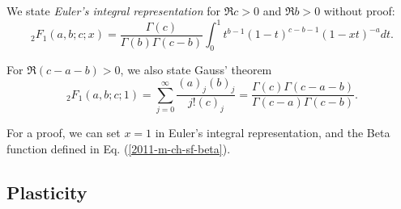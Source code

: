 We state {\em Euler's integral representation} for $\Re c>0$ and $\Re b>0$  without proof:
\begin{equation}
 {\;}_2F_1(a,b;c;x)=\frac{\Gamma(c)}{\Gamma(b)\Gamma(c-b)}
\int_0^1 t^{b-1}(1-t)^{c-b-1}(1-xt)^{-a} dt
.
\end{equation}


For  $\Re (c-a-b)>0$, we also state Gauss' theorem
\begin{equation}
 {\;}_2F_1(a,b;c;1)=\sum_{j=0}^\infty \frac{(a)_j(b)_j}{j! (c)_j} =\frac{\Gamma(c)\Gamma(c-a-b)}{\Gamma(c-a)\Gamma(c-b)}.
\end{equation}

{\color{OliveGreen}
\bproof
For a proof, we can set $x=1$ in Euler's integral representation, and the Beta function defined in Eq.
(\ref{2011-m-ch-sf-beta}).
\eproof
}

\subsection{Plasticity}

